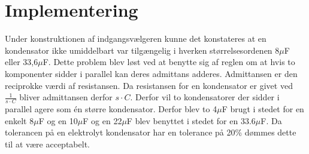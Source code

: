 \section{Implementering}
Under konstruktionen af indgangsvælgeren kunne det konstateres at en kondensator ikke umiddelbart var tilgængelig i hverken størrelsesordenen 8$\mu$F eller 33,6$\mu$F. Dette problem blev løst ved at benytte sig af reglen om at hvis to komponenter sidder i parallel kan deres admittans adderes. Admittansen er den reciprokke værdi af resistansen. Da resistansen for en kondensator er givet ved $\frac{1}{s\cdot C}$ bliver admittansen derfor $s\cdot C$. Derfor vil to kondensatorer der sidder i parallel agere som én større kondensator. Derfor blev to 4$\mu$F brugt i stedet for en enkelt 8$\mu$F og en 10$\mu$F og en 22$\mu$F blev benyttet i stedet for en 33.6$\mu$F. Da tolerancen på en elektrolyt kondensator har en tolerance på 20\%  dømmes dette til at være acceptabelt.
